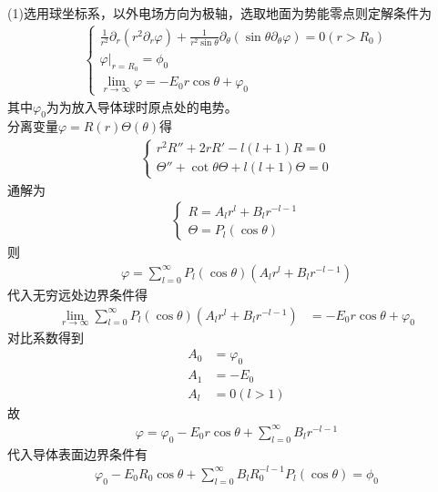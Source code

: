 \documentclass{phyasgn}
\begin{document}
\begin{sol}[1]
  (1)选用球坐标系，以外电场方向为极轴，选取地面为势能零点则定解条件为
  \begin{align*}
    \left\{\begin{matrix}
      \frac{1}{r^2}\partial_r(r^2\partial_r \varphi)+\frac{1}{r^2\sin\theta}\partial_\theta(\sin\theta\partial_\theta \varphi)=0(r>R_0)\\
      \varphi|_{r=R_0}=\phi_0\\
      \lim_{r\to\infty}\varphi=-E_0r\cos\theta+\varphi_0
    \end{matrix}\right.
  \end{align*}
  其中$\varphi_0$为为放入导体球时原点处的电势。\\
  分离变量$\varphi=R(r)\Theta(\theta)$得
  \begin{align*}
    \left\{\begin{matrix}
      r^2R''+2rR'-l(l+1)R=0\\
      \Theta''+\cot\theta\Theta+l(l+1)\Theta=0
    \end{matrix}\right.
  \end{align*}
  通解为
  \begin{align*}
    \left\{\begin{matrix}
      R=A_lr^l+B_lr^{-l-1}\\
      \Theta=P_l(\cos\theta)
    \end{matrix}\right.
  \end{align*}
  则\begin{align*}
    \varphi=\sum_{l=0}^{\infty}P_l(\cos\theta)(A_lr^l+B_lr^{-l-1})
  \end{align*}
  代入无穷远处边界条件得
  \begin{align*}
    \lim_{r\to\infty}\sum_{l=0}^{\infty}P_l(\cos\theta)(A_lr^l+B_lr^{-l-1})&=-E_0r\cos\theta+\varphi_0
  \end{align*}
  对比系数得到
  \begin{align*}
    A_0&=\varphi_0\\
    A_1&=-E_0\\
    A_l&=0(l>1)
  \end{align*}
  故
  \begin{align*}
    \varphi=\varphi_0-E_0r\cos\theta+\sum_{l=0}^{\infty}B_lr^{-l-1}
  \end{align*}
  代入导体表面边界条件有
  \begin{align*}
    \varphi_0-E_0R_0\cos\theta+\sum_{l=0}^{\infty}B_lR_0^{-l-1}P_l(\cos\theta)=\phi_0
  \end{align*}

\end{sol}
\end{document}
